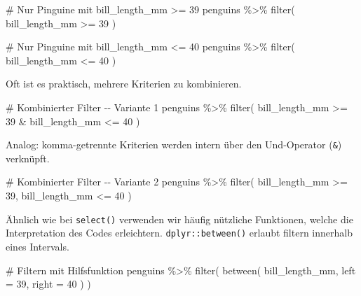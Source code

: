 \documentclass[
  a4paper,
  DIV=11,
  oneside]{scrreprt}
\newenvironment{Shaded}{\begin{snugshade}}{\end{snugshade}}
\newcommand{\NormalTok}[1]{\textcolor[rgb]{0.00,0.23,0.31}{#1}}
\begin{document}
\begin{Shaded}
\begin{Highlighting}[]
\NormalTok{\# Nur Pinguine mit bill\_length\_mm \textgreater{}= 39}
\NormalTok{penguins \%\textgreater{}\% }
\NormalTok{  filter(}
\NormalTok{    bill\_length\_mm \textgreater{}= 39}
\NormalTok{  )}
\end{Highlighting}
\end{Shaded}

\begin{Shaded}
\begin{Highlighting}[]
\NormalTok{\# Nur Pinguine mit bill\_length\_mm \textless{}= 40}
\NormalTok{penguins \%\textgreater{}\% }
\NormalTok{  filter(}
\NormalTok{    bill\_length\_mm \textless{}= 40}
\NormalTok{  )}
\end{Highlighting}
\end{Shaded}

Oft ist es praktisch, mehrere Kriterien zu kombinieren.

\begin{Shaded}
\begin{Highlighting}[]
\NormalTok{\# Kombinierter Filter {-}{-} Variante 1}
\NormalTok{penguins \%\textgreater{}\% }
\NormalTok{  filter(}
\NormalTok{    bill\_length\_mm \textgreater{}= 39 \& bill\_length\_mm \textless{}= 40}
\NormalTok{  )}
\end{Highlighting}
\end{Shaded}

Analog: komma-getrennte Kriterien werden intern über den Und-Operator
(\texttt{\&}) verknüpft.

\begin{Shaded}
\begin{Highlighting}[]
\NormalTok{\# Kombinierter Filter {-}{-} Variante 2}
\NormalTok{penguins \%\textgreater{}\% }
\NormalTok{  filter(}
\NormalTok{    bill\_length\_mm \textgreater{}= 39, }
\NormalTok{    bill\_length\_mm \textless{}= 40}
\NormalTok{  )}
\end{Highlighting}
\end{Shaded}

Ähnlich wie bei \texttt{select()} verwenden wir häufig nützliche
Funktionen, welche die Interpretation des Codes erleichtern.
\texttt{dplyr::between()} erlaubt filtern innerhalb eines Intervals.

\begin{Shaded}
\begin{Highlighting}[]
\NormalTok{\# Filtern mit Hilfsfunktion}
\NormalTok{penguins \%\textgreater{}\% }
\NormalTok{  filter(}
\NormalTok{    between(}
\NormalTok{      bill\_length\_mm, left = 39, right = 40}
\NormalTok{    )}
\NormalTok{  )}
\end{Highlighting}
\end{Shaded}
\end{document}
